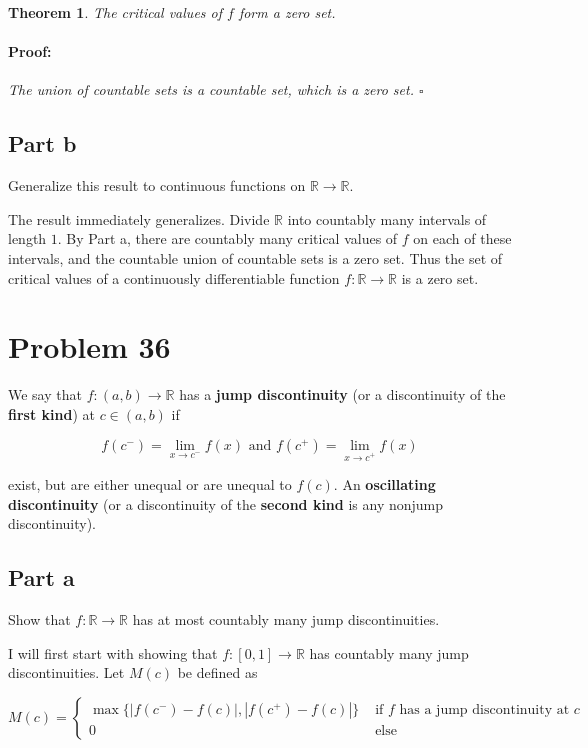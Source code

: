 \documentclass{article}
\newenvironment{proof}{\paragraph{Proof:}}{\hfill$\square$}
\newtheorem{theorem}{Theorem}
\newcommand{\R}{\mathbb{R}}
\begin{document}
\begin{theorem}
The critical values of $f$ form a zero set.
\begin{proof}
The union of countable sets is a countable set, which is a zero set.
\end{proof}
\end{theorem}

\subsection*{Part b}

Generalize this result to continuous functions on $\R \rightarrow \R$.

The result immediately generalizes. Divide $\R$ into countably many intervals of length $1$. By Part a, there are countably many critical values of $f$ on each of these intervals, and the countable union of countable sets is a zero set. Thus the set of critical values of a continuously differentiable function $f: \R \rightarrow \R$ is a zero set. 

\section*{Problem 36}

We say that $f: (a, b) \rightarrow \R$ has a \textbf{jump discontinuity} (or a discontinuity of the \textbf{first kind}) at $c \in (a, b)$ if

\[
f(c^-) = \lim_{x \rightarrow c^-} f(x) \text{ and } f(c^+) = \lim_{x \rightarrow c^+} f(x)
\]

exist, but are either unequal or are unequal to $f(c)$. An \textbf{oscillating discontinuity} (or a discontinuity of the \textbf{second kind} is any nonjump discontinuity).

\subsection*{Part a}

Show that $f: \R \rightarrow \R$ has at most countably many jump discontinuities.

I will first start with showing that $f: [0, 1] \rightarrow \R$ has countably many jump discontinuities. Let $M(c)$ be defined as

\[
M(c) =
\begin{cases}
\max\{ |f(c^-) - f(c)|, |f(c^+) - f(c)|\} & \text{ if } f \text{ has a jump discontinuity at } c \\
0 & \text{ else}
\end{cases}
\]
\end{document}
